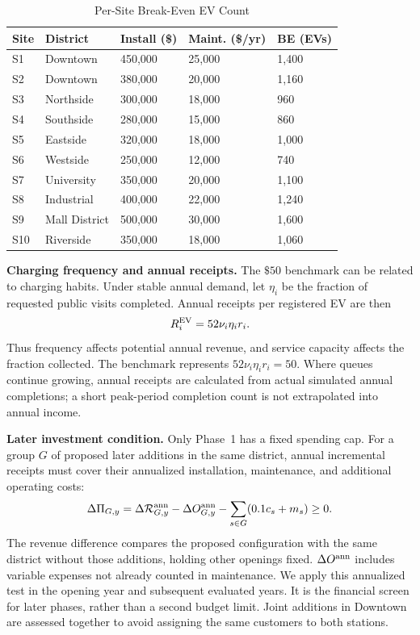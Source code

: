 \documentclass[12pt]{article}
\begin{document}
\begin{table}[H]
\centering
\caption{Per-Site Break-Even EV Count}
\label{tab:breakeven}
\renewcommand{\arraystretch}{0.95}
\begin{tabular}{@{}p{}p{}p{}p{}p{}@{}}
\toprule
Site & District & Install (\$) & Maint. (\$/yr) & BE (EVs) \\
\midrule
S1 & Downtown & 450,000 & 25,000 & 1,400 \\
S2 & Downtown & 380,000 & 20,000 & 1,160 \\
S3 & Northside & 300,000 & 18,000 & 960 \\
S4 & Southside & 280,000 & 15,000 & 860 \\
S5 & Eastside & 320,000 & 18,000 & 1,000 \\
S6 & Westside & 250,000 & 12,000 & 740 \\
S7 & University & 350,000 & 20,000 & 1,100 \\
S8 & Industrial & 400,000 & 22,000 & 1,240 \\
S9 & Mall District & 500,000 & 30,000 & 1,600 \\
S10 & Riverside & 350,000 & 18,000 & 1,060 \\
\bottomrule
\end{tabular}
\end{table}

\textbf{Charging frequency and annual receipts.} The $\$50$ benchmark can be related
to charging habits. Under stable annual demand, let $\eta_i$ be the fraction of requested
public visits completed. Annual receipts per registered EV are then
\begin{equation}
R_i^{\rm EV}=52\nu_i\eta_i r_i.\label{eq:annual-receipt}
\end{equation}
Thus frequency affects potential annual revenue, and service capacity affects the
fraction collected. The benchmark represents $52\nu_i\eta_i r_i=50$. Where queues
continue growing, annual receipts are calculated from actual simulated annual
completions; a short peak-period completion count is not extrapolated into annual income.

\textbf{Later investment condition.} Only Phase~1 has a fixed spending cap. For a group
$G$ of proposed later additions in the same district, annual incremental receipts must
cover their annualized installation, maintenance, and additional operating costs:
\begin{equation}
\Delta\Pi_{G,y}=\Delta\mathcal R^{\rm ann}_{G,y}-\Delta O^{\rm ann}_{G,y}
-\sum_{s\in G}(0.1c_s+m_s)\ge0.
\label{eq:viability}
\end{equation}
The revenue difference compares the proposed configuration with the same district
without those additions, holding other openings fixed. $\Delta O^{\rm ann}$ includes
variable expenses not already counted in maintenance. We apply this annualized test
in the opening year and subsequent evaluated years. It is the financial screen for
later phases, rather than a second budget limit. Joint additions in Downtown are
assessed together to avoid assigning the same customers to both stations.
\end{document}

